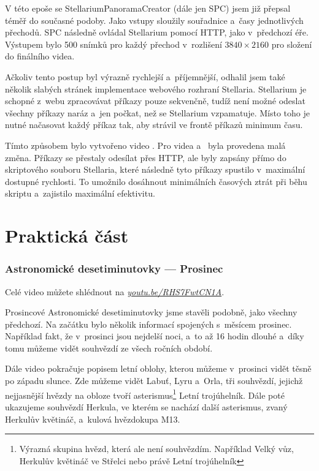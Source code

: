 \documentclass[12pt,a4paper,titlepage]{article}
\newcommand{\link}[2]{\href{#1}{\textcolor{link-color}{\textit{#2}}}}%
\begin{document}
V této epoše se StellariumPanoramaCreator (dále jen SPC) jsem již přepsal téměř do současné podoby. Jako vstupy sloužily souřadnice a~časy jednotlivých přechodů. SPC následně ovládal Stellarium pomocí HTTP, jako v~předchozí éře. Výstupem bylo 500 snímků pro každý přechod v~rozlišení \(3840\times2160\) pro složení do finálního videa. 

Ačkoliv tento postup byl výrazně rychlejší a~příjemnější, odhalil jsem také několik slabých stránek implementace webového rozhraní Stellaria. Stellarium je schopné z~webu zpracovávat příkazy pouze sekvenčně, tudíž není možné odeslat všechny příkazy naráz a~jen počkat, než se Stellarium vzpamatuje. Místo toho je nutné načasovat každý příkaz tak, aby strávil ve frontě příkazů minimum času. 

Tímto způsobem bylo vytvořeno video . Pro videa  a~ byla provedena malá změna. Příkazy se přestaly odesílat přes HTTP, ale byly zapsány přímo do skriptového souboru Stellaria, které následně tyto příkazy spustilo v~maximální dostupné rychlosti. To umožnilo dosáhnout minimálních časových ztrát při běhu skriptu a~zajistilo maximální efektivitu.
\newpage
\part{Praktická část}
\section{Astronomické desetiminutovky --- Prosinec}
Celé video můžete shlédnout na \link{https://youtu.be/RHS7FwtCN1A}{youtu.be/RHS7FwtCN1A}.

Prosincové Astronomické desetiminutovky jsme stavěli podobně, jako všech\-ny předchozí. Na začátku bylo několik informací spojených s~měsícem prosinec. Například fakt, že v~prosinci jsou nejdelší noci, a~to až 16 hodin dlouhé a~díky tomu můžeme vidět souhvězdí ze všech ročních období. 

Dále video pokračuje popisem letní oblohy, kterou můžeme v~prosinci vidět těsně po západu slunce. Zde můžeme vidět Labuť, Lyru a~Orla, tři souhvězdí, jejichž nejjasnější hvězdy na obloze tvoří asterismus\footnote{Výrazná skupina hvězd, která ale není souhvězdím. Například Velký vůz, Herkulův květináč ve Střelci nebo právě Letní trojúhelník} Letní trojúhelník. Dále poté ukazujeme souhvězdí Herkula, ve kterém se nachází další asterismus, zvaný Herkulův květináč, a~kulová hvězdokupa M13.
\end{document}
